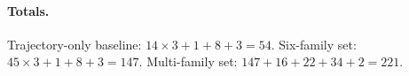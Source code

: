 \paragraph{Totals.} Trajectory-only baseline: $14\times3+1+8+3=54$. Six-family set: $45\times3+1+8+3=147$.
Multi-family set: $147+16+22+34+2=221$. 
